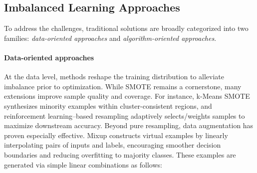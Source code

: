 \subsection{Imbalanced Learning Approaches}
\label{Mixup_interpolation}
To address the challenges, traditional solutions are broadly categorized into two families: \textit{data-oriented approaches} and \textit{algorithm-oriented approaches}.



\paragraph{Data-oriented approaches} At the data level, methods reshape the training distribution to alleviate imbalance prior to optimization. While SMOTE \cite{chawla2002smote} remains a cornerstone, many extensions improve sample quality and coverage. For instance, k-Means SMOTE \cite{douzas2018improving} synthesizes minority examples within cluster-consistent regions, and reinforcement learning–based resampling \cite{fan2021imbalanced} adaptively selects/weights samples to maximize downstream accuracy. Beyond pure resampling, data augmentation has proven especially effective. Mixup \cite{zhang2017Mixup} constructs virtual examples by linearly interpolating pairs of inputs and labels, encouraging smoother decision boundaries and reducing overfitting to majority classes. These examples are generated via simple linear combinations as follows:

